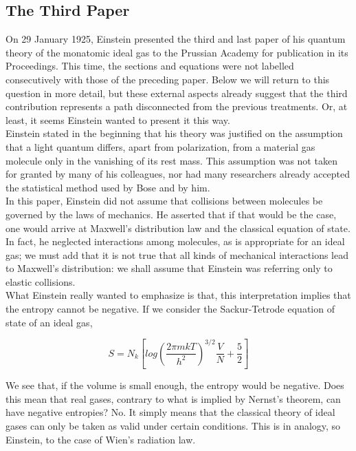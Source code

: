 \documentclass[12pt, letterpaper]{article}
\begin{document}
    \subsection*{The Third Paper}
    On 29 January 1925, Einstein presented the third and last paper of his quantum
    theory of the monatomic ideal gas to the Prussian Academy for publication
    in its Proceedings. This time, the sections and equations were not labelled
    consecutively with those of the preceding paper. Below we will return to this
    question in more detail, but these external aspects already suggest that the third
    contribution represents a path disconnected from the previous treatments. Or,
    at least, it seems Einstein wanted to present it this way. \\ 
    
    
    Einstein stated in the beginning that his theory was justified on the assumption that a light quantum differs, apart from polarization, from a material gas
    molecule only in the vanishing of its rest mass. This assumption was not taken
    for granted by many of his colleagues, nor had many researchers already accepted the statistical method used by Bose and by him.\\ 

    In this paper, Einstein did not assume that collisions between molecules be
    governed by the laws of mechanics. He asserted that if that would be the case,
    one would arrive at Maxwell’s distribution law and the classical equation of
    state. In fact, he neglected interactions among molecules, as is
    appropriate for an ideal gas; we must add that it is not true that all kinds of
    mechanical interactions lead to Maxwell’s distribution: we shall assume that
    Einstein was referring only to elastic collisions. \\

    What Einstein really wanted to emphasize is that, this interpretation implies
    that the entropy cannot be negative. If we consider the Sackur-Tetrode equation
    of state of an ideal gas,

    \begin{equation}
        S = N_{k}[log(\frac{2\pi mkT}{h^{2}})^{3/2}\frac{V}{N} + \frac{5}{2}]
    \end{equation}

    We see that, if the volume is small enough, the entropy would be negative. Does
    this mean that real gases, contrary to what is implied by Nernst’s theorem, can
    have negative entropies? No. It simply means that the classical theory of ideal
    gases can only be taken as valid under certain conditions. This is in analogy, so
    Einstein, to the case of Wien’s radiation law.
\end{document}
